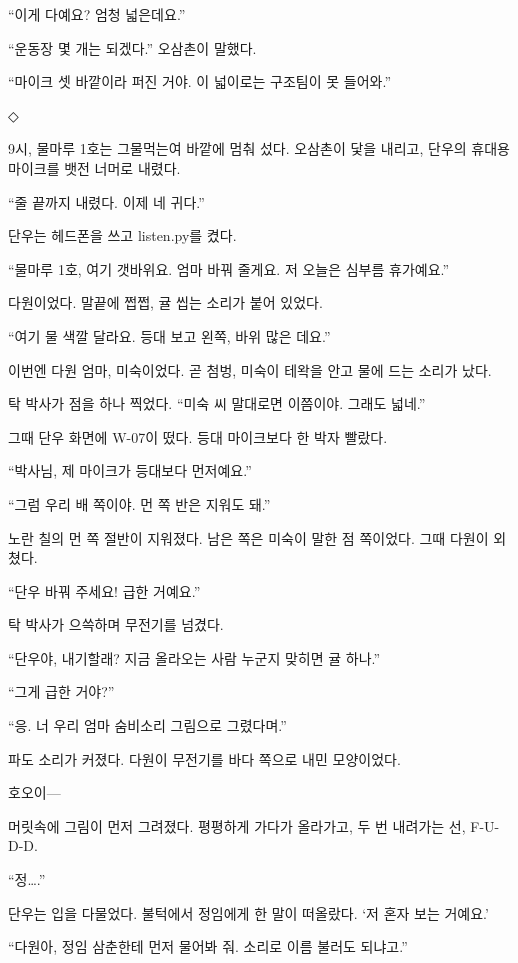 \documentclass[
  korean,
  letterpaper,
  twoside,
  open=any,
  fontsize=12.5pt,
  headings=small]{scrbook}
\begin{document}
``이게 다예요? 엄청
넓은데요.''

``운동장 몇 개는 되겠다.''
오삼촌이 말했다.

``마이크 셋 바깥이라 퍼진
거야. 이 넓이로는 구조팀이 못
들어와.''

\begin{center}◇\end{center}\nopagebreak

9시, 물마루 1호는 그물먹는여
바깥에 멈춰 섰다. 오삼촌이
닻을 내리고, 단우의 휴대용
마이크를 뱃전 너머로 내렸다.

``줄 끝까지 내렸다. 이제 네
귀다.''

단우는 헤드폰을 쓰고
listen.py를 켰다.

``물마루 1호, 여기 갯바위요.
엄마 바꿔 줄게요. 저 오늘은
심부름 휴가예요.''

다원이었다. 말끝에 쩝쩝, 귤
씹는 소리가 붙어 있었다.

``여기 물 색깔 달라요. 등대
보고 왼쪽, 바위 많은 데요.''

이번엔 다원 엄마, 미숙이었다.
곧 첨벙, 미숙이 테왁을 안고
물에 드는 소리가 났다.

탁 박사가 점을 하나 찍었다.
``미숙 씨 말대로면 이쯤이야.
그래도 넓네.''

그때 단우 화면에 W-07이 떴다.
등대 마이크보다 한 박자
빨랐다.

``박사님, 제 마이크가 등대보다
먼저예요.''

``그럼 우리 배 쪽이야. 먼 쪽
반은 지워도 돼.''

노란 칠의 먼 쪽 절반이
지워졌다. 남은 쪽은 미숙이
말한 점 쪽이었다. 그때 다원이
외쳤다.

``단우 바꿔 주세요! 급한
거예요.''

탁 박사가 으쓱하며 무전기를
넘겼다.

``단우야, 내기할래? 지금
올라오는 사람 누군지 맞히면 귤
하나.''

``그게 급한 거야?''

``응. 너 우리 엄마 숨비소리
그림으로 그렸다며.''

파도 소리가 커졌다. 다원이
무전기를 바다 쪽으로 내민
모양이었다.

호오이---

머릿속에 그림이 먼저 그려졌다.
평평하게 가다가 올라가고, 두
번 내려가는 선,
\mbox{F-U-D-D.}

``정\ldots.''

단우는 입을 다물었다. 불턱에서
정임에게 한 말이 떠올랐다. `저
혼자 보는 거예요.'

``다원아, 정임 삼춘한테 먼저
물어봐 줘. 소리로 이름 불러도
되냐고.''
\end{document}
